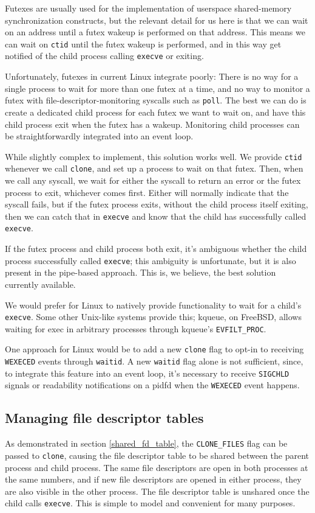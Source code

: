 \documentclass[letterpaper,twocolumn,10pt]{article}
\begin{document}
Futexes are usually used for the implementation of userspace shared-memory synchronization constructs,
but the relevant detail for us here is that we can wait on an address
until a futex wakeup is performed on that address.
This means we can wait on \texttt{ctid} until the futex wakeup is performed,
and in this way get notified of the child process calling \texttt{execve} or exiting.

Unfortunately, futexes in current Linux integrate poorly:
There is no way for a single process to wait for more than one futex at a time,
and no way to monitor a futex with file-descriptor-monitoring syscalls such as \texttt{poll}.
The best we can do is create a dedicated child process for each futex we want to wait on,
and have this child process exit when the futex has a wakeup.
Monitoring child processes can be straightforwardly integrated into an event loop.

While slightly complex to implement, this solution works well.
We provide \texttt{ctid} whenever we call \texttt{clone},
and set up a process to wait on that futex.
Then, when we call any syscall,
we wait for either the syscall to return an error or the futex process to exit,
whichever comes first.
Either will normally indicate that the syscall fails,
but if the futex process exits,
without the child process itself exiting,
then we can catch that in \texttt{execve} and know that the child has successfully called \texttt{execve}.

If the futex process and child process both exit,
it's ambiguous whether the child process successfully called \texttt{execve};
this ambiguity is unfortunate, but it is also present in the pipe-based approach.
This is, we believe, the best solution currently available.

We would prefer for Linux to natively provide functionality to wait for a child's \texttt{execve}.
Some other Unix-like systems provide this;
kqueue, on FreeBSD, allows waiting for exec in arbitrary processes through kqueue's \verb|EVFILT_PROC|.

One approach for Linux would be to add a new \texttt{clone} flag to
opt-in to receiving \texttt{WEXECED} events through \texttt{waitid}.
A new \texttt{waitid} flag alone is not sufficient,
since, to integrate this feature into an event loop,
it's necessary to receive \texttt{SIGCHLD} signals or readability notifications on a pidfd
when the \texttt{WEXECED} event happens.
\subsection{Managing file descriptor tables}\label{fdtables}
As demonstrated in section \ref{shared_fd_table},
the \verb|CLONE_FILES| flag can be passed to \texttt{clone},
causing the file descriptor table to be shared between the parent process and child process.
The same file descriptors are open in both processes at the same numbers,
and if new file descriptors are opened in either process,
they are also visible in the other process.
The file descriptor table is unshared once the child calls \texttt{execve}.
This is simple to model and convenient for many purposes.
\end{document}
